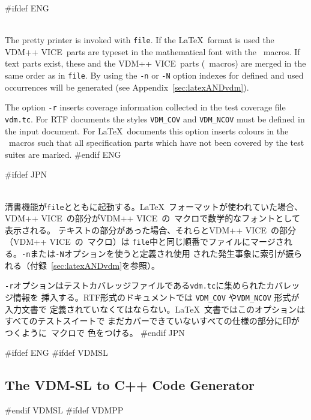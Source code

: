 \documentclass[\pformat,12pt]{article}
\newcommand{\vdmslpp}{VDM-SL}
\newcommand{\VdmSlPp}{\VdmSl}
\newcommand{\vdmslpp}{VDM++}
\DeclareRobustCommand{\VdmSlPp}{VDM++-\VdmSl}
\renewcommand{\vdmslpp}{VDM++ VICE}
\DeclareRobustCommand{\VdmSlPp}{VDM++ VICE-\VdmSl}
\begin{document}
\begin{description} 

#ifdef ENG
\item[latex (l) \mbox{[{\tt -nNr}]} {\tt file}] \mbox{}\\
  The pretty printer is invoked with {\tt file}.  If the \LaTeX\ format is
  used the \vdmslpp\ 
  parts are typeset in the mathematical font with the \VdmSlPp\ 
  macros.  If text parts exist, these and the \vdmslpp\ parts
  (\VdmSlPp\ macros) are merged in the same order as in {\tt file}.
  By using the {\tt -n} or {\tt -N} option indexes for defined and
  used occurrences will be generated (see
  Appendix~\ref{sec:latexANDvdm}).
  
  The option {\tt -r} inserts coverage information collected in the
test coverage file {\tt vdm.tc}. For RTF documents
the styles {\tt VDM\_COV} and {\tt VDM\_NCOV} must be defined in the
input document.  For \LaTeX\ documents this option inserts colours in
the \VdmSlPp\ macros such that all specification parts which have not
been covered by the test suites are marked.
#endif ENG

#ifdef JPN
\item[latex (l) \mbox{[{\tt -nNr}]} {\tt file}] \mbox{}\\
  清書機能が{\tt file}とともに起動する。\LaTeX\ フォーマットが使われていた場合、
  \vdmslpp\ の部分が\vdmslpp\ の\VdmSlPp\ マクロで数学的なフォントとして表示される。
  テキストの部分があった場合、それらと\vdmslpp\ の部分（\vdmslpp\ の\VdmSlPp\ マクロ）は
  {\tt file}中と同じ順番でファイルにマージされる。{\tt -n}または{\tt -N}オプションを使うと定義され使用
  された発生事象に索引が振られる（付録~\ref{sec:latexANDvdm}を参照）。
  
{\tt -r}オプションはテストカバレッジファイルである{\tt vdm.tc}に集められたカバレッジ情報を
挿入する。RTF形式のドキュメントでは {\tt VDM\_COV} や{\tt VDM\_NCOV} 形式が入力文書で
定義されていなくてはならない。\LaTeX\ 文書ではこのオプションはすべてのテストスイートで
まだカバーできていないすべての仕様の部分に印がつくように\VdmSlPp\ マクロで
色をつける。
#endif JPN

\end{description}


\newpage
#ifdef ENG
#ifdef VDMSL
\subsection{The VDM-SL to C++ Code Generator}\label{sec:cg}
#endif VDMSL
#ifdef VDMPP
\end{document}
